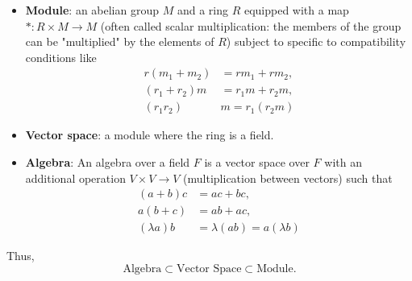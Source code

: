 \begin{itemize}
	\item\textbf{Module}: an abelian group $M$ and a ring $R$ equipped with a map $*: R\times M\rightarrow M$ (often called scalar multiplication: the members of the group can be "multiplied" by the elements of $R$) subject to specific to compatibility conditions like
	\begin{align*}
		r(m_1 + m_2) &= rm_1 + rm_2,\\
		(r_1 + r_2)m &= r_1m + r_2m,\\
		(r_1r_2)&m=r_1(r_2m)
	\end{align*}
	\item\textbf{Vector space}: a module where the ring is a field.
	\item\textbf{Algebra}: An algebra over a field $F$ is a vector space over $F$ with an additional operation $V\times V\rightarrow V$ (multiplication between vectors) such that 
	\begin{align*}
		(a + b)c &= ac + bc,\\
		a(b+c) &= ab + ac,\\
		(\lambda a)b& = \lambda(ab) = a(\lambda b)
	\end{align*}
\end{itemize}
Thus,
$$
	\text{Algebra}\subset \text{Vector Space}\subset \text{Module}.
$$
